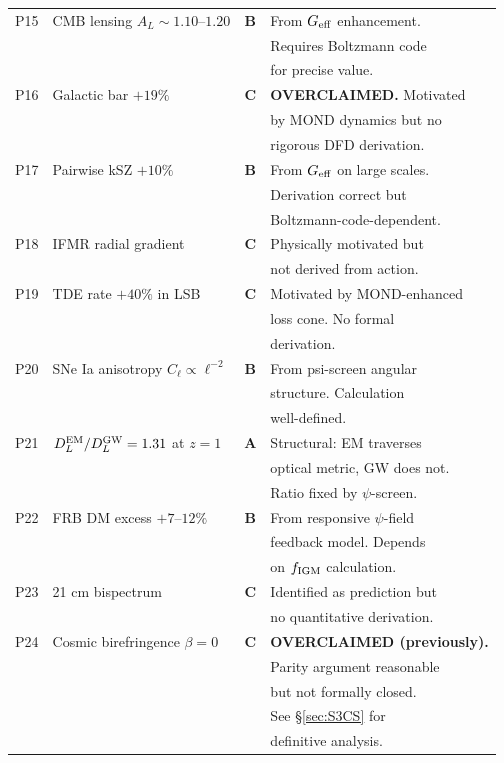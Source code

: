 \documentclass[11pt]{article}
\begin{document}
\begin{longtable}{clcl}
P15 & CMB lensing $A_L \sim 1.10$--$1.20$ & \textbf{B} &
  From $G_{\rm eff}$ enhancement.  \\
  & & & Requires Boltzmann code \\
  & & & for precise value. \\

P16 & Galactic bar $+19\%$ & \textbf{C} &
  \textbf{OVERCLAIMED.}  Motivated \\
  & & & by MOND dynamics but no \\
  & & & rigorous DFD derivation. \\

P17 & Pairwise kSZ $+10\%$ & \textbf{B} &
  From $G_{\rm eff}$ on large scales. \\
  & & & Derivation correct but \\
  & & & Boltzmann-code-dependent. \\

P18 & IFMR radial gradient & \textbf{C} &
  Physically motivated but \\
  & & & not derived from action. \\

P19 & TDE rate $+40\%$ in LSB & \textbf{C} &
  Motivated by MOND-enhanced \\
  & & & loss cone.  No formal \\
  & & & derivation. \\

P20 & SNe Ia anisotropy $C_\ell \propto \ell^{-2}$ & \textbf{B} &
  From psi-screen angular \\
  & & & structure.  Calculation \\
  & & & well-defined. \\

P21 & $D_L^{\rm EM}/D_L^{\rm GW} = 1.31$ at $z=1$ & \textbf{A} &
  Structural: EM traverses \\
  & & & optical metric, GW does not. \\
  & & & Ratio fixed by $\psi$-screen. \\

P22 & FRB DM excess $+7$--$12\%$ & \textbf{B} &
  From responsive $\psi$-field \\
  & & & feedback model.  Depends \\
  & & & on $f_{\rm IGM}$ calculation. \\

P23 & 21 cm bispectrum & \textbf{C} &
  Identified as prediction but \\
  & & & no quantitative derivation. \\

P24 & Cosmic birefringence $\beta = 0$ & \textbf{C} &
  \textbf{OVERCLAIMED (previously).} \\
  & & & Parity argument reasonable \\
  & & & but not formally closed. \\
  & & & See \S\ref{sec:S3CS} for \\
  & & & definitive analysis. \\

\bottomrule
\end{longtable}
\end{document}
